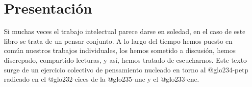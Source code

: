 



\ifPDF

\usepackage[hyphenation,homeoarchy,homeoarchywordcolor=orange, homeoarchycharcolor=orange,draft]{impnattypo}
\usepackage[allcolors=magenta, colorlinks, unicode]{hyperref}
\usepackage{easyReview}
\usepackage{hyperxmp}

\else
\ifBNPDF
\usepackage[width=18truecm,height=25.5truecm,cam,center]{crop}
\newcommand*\infofont[1]{\sf{\footnotesize #1 (alberto.alejandro.moyano@gmail.com)}}
\crop[font=infofont]
\usepackage[hidelinks, unicode]{hyperref}
\usepackage{hyperxmp}

\else
\ifPNGEPUB
\usepackage[hidelinks, unicode]{hyperref}
\else
\ifHTMLEPUB
\usepackage[allcolors=blue,colorlinks,hyperindex=true,unicode]{hyperref}
\fi
\fi
\fi
\fi










\frontmatter



\tableofcontents


%
%
%
%
%
%
%
%




%
%
%
%
%
%
%
%
%
%
%
%
%
%
%
%
%
%

\chapter{Presentación}

Si muchas veces el trabajo intelectual parece darse en soledad, en el caso de este libro se trata de un pensar conjunto. A lo largo del tiempo hemos puesto en común nuestros trabajos individuales, los hemos sometido a discusión, hemos discrepado, compartido lecturas, y así, hemos tratado de escucharnos. Este texto surge de un ejercicio colectivo de pensamiento nucleado en torno al \gls{@glo234-petp} radicado en el \gls{@glo232-ciecs} de la \gls{@glo235-unc} y el \gls{@glo233-cne}.

